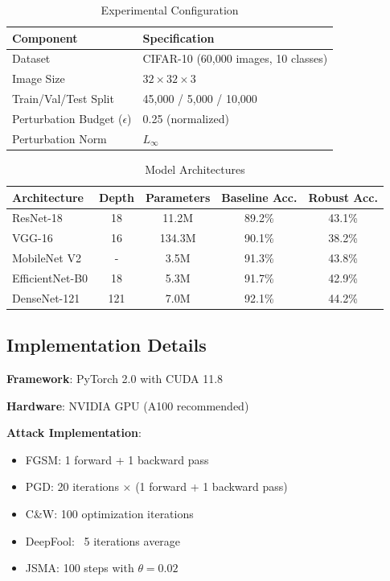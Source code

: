 \documentclass[10pt,conference]{IEEEtran}
\begin{document}
\begin{table}[H]
\centering
\caption{Experimental Configuration}
\label{tab:config}
\begin{tabular}{ll}
\toprule
\textbf{Component} & \textbf{Specification} \\
\midrule
Dataset & CIFAR-10 (60,000 images, 10 classes) \\
Image Size & $32 \times 32 \times 3$ \\
Train/Val/Test Split & 45,000 / 5,000 / 10,000 \\
Perturbation Budget ($\epsilon$) & 0.25 (normalized) \\
Perturbation Norm & $L_\infty$ \\
\toprule
\end{tabular}
\end{table}

\begin{table}[H]
\centering
\caption{Model Architectures}
\label{tab:models}
\begin{tabular}{lcccc}
\toprule
\textbf{Architecture} & \textbf{Depth} & \textbf{Parameters} & \textbf{Baseline Acc.} & \textbf{Robust Acc.} \\
\midrule
ResNet-18 & 18 & 11.2M & 89.2\% & 43.1\% \\
VGG-16 & 16 & 134.3M & 90.1\% & 38.2\% \\
MobileNet V2 & - & 3.5M & 91.3\% & 43.8\% \\
EfficientNet-B0 & 18 & 5.3M & 91.7\% & 42.9\% \\
DenseNet-121 & 121 & 7.0M & 92.1\% & 44.2\% \\
\toprule
\end{tabular}
\end{table}

\subsection{Implementation Details}

\textbf{Framework}: PyTorch 2.0 with CUDA 11.8

\textbf{Hardware}: NVIDIA GPU (A100 recommended)

\textbf{Attack Implementation}:
\begin{itemize}
    \item FGSM: 1 forward + 1 backward pass
    \item PGD: 20 iterations × (1 forward + 1 backward pass)
    \item C\&W: 100 optimization iterations
    \item DeepFool: ~5 iterations average
    \item JSMA: 100 steps with $\theta = 0.02$
\end{itemize}
\end{document}
